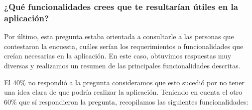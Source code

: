 \documentclass[a4paper,12pt]{article}
\begin{document}
    \subsubsection{¿Qué funcionalidades crees que te resultarían útiles en la aplicación?}
    Por último, esta pregunta estaba orientada a consultarle a las personas que contestaron la encuesta, cuáles serían los requerimientos o funcionalidades que creían necesarias en la aplicación. \newline
    En este caso, obtuvimos respuestas muy diversas y realizamos un resumen de las principales funcionalidades descritas. \newline
         \newline
    El 40\% no respondió a la pregunta consideramos que esto sucedió por no tener una idea clara de que podría realizar la aplicación. \newline
    Teniendo en cuenta el otro 60\% que sí respondieron la pregunta, recopilamos las siguientes funcionalidades:
\end{document}
